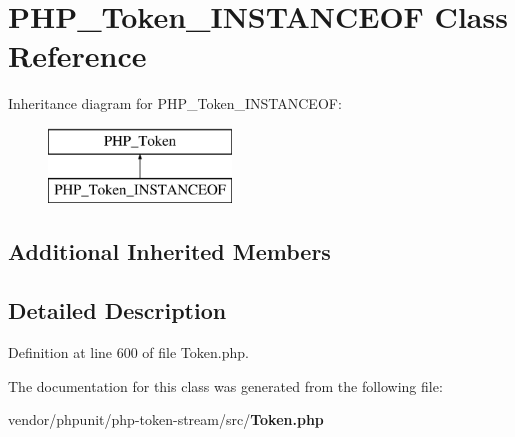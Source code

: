 \section{P\+H\+P\+\_\+\+Token\+\_\+\+I\+N\+S\+T\+A\+N\+C\+E\+O\+F Class Reference}
\label{class_p_h_p___token___i_n_s_t_a_n_c_e_o_f}
Inheritance diagram for P\+H\+P\+\_\+\+Token\+\_\+\+I\+N\+S\+T\+A\+N\+C\+E\+O\+F\+:\begin{figure}[H]
\begin{center}
\leavevmode
\includegraphics[height=2.000000cm]{class_p_h_p___token___i_n_s_t_a_n_c_e_o_f}
\end{center}
\end{figure}
\subsection*{Additional Inherited Members}


\subsection{Detailed Description}


Definition at line 600 of file Token.\+php.



The documentation for this class was generated from the following file\+:\begin{DoxyCompactItemize}
\item 
vendor/phpunit/php-\/token-\/stream/src/{\bf Token.\+php}\end{DoxyCompactItemize}
